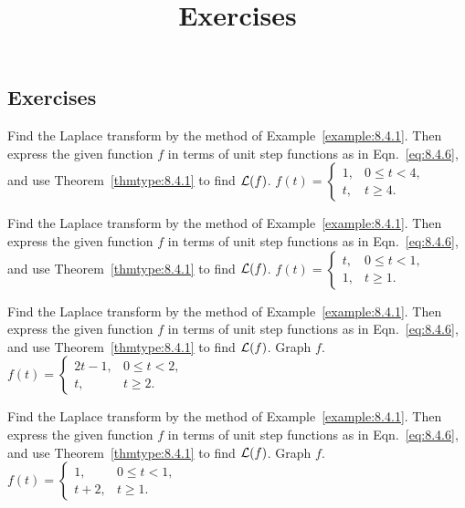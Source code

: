 \documentclass{ximera}
\title{Exercises} \license{CC BY-NC-SA 4.0}
\begin{document}
\begin{abstract}
\end{abstract}
\maketitle

\begin{onlineOnly}
\section*{Exercises}
\end{onlineOnly}

\begin{problem}\label{exer:8.4.1} 
Find the Laplace transform by
the method of Example~\ref{example:8.4.1}. Then express the given function
$f$ in terms of unit step functions as in Eqn.~\eqref{eq:8.4.6}, and use
Theorem~\ref{thmtype:8.4.1} to find ${\cal L}(f)$.
$f(t)=\left\{\begin{array}{cl} 1,&0
\le t<4,\\ t,&t\ge4.\end{array}\right.$
\end{problem}

\begin{problem}\label{exer:8.4.2} 
Find the Laplace transform by
the method of Example~\ref{example:8.4.1}. Then express the given function
$f$ in terms of unit step functions as in Eqn.~\eqref{eq:8.4.6}, and use
Theorem~\ref{thmtype:8.4.1} to find ${\cal L}(f)$.
$f(t)=\left\{\begin{array}{cl} t,&0
\le t<1,\\ 1,&t\ge1.\end{array}\right.$
\end{problem}

\begin{problem}\label{exer:8.4.3} 
Find the Laplace transform by
the method of Example~\ref{example:8.4.1}. Then express the given function
$f$ in terms of unit step functions as in Eqn.~\eqref{eq:8.4.6}, and use
Theorem~\ref{thmtype:8.4.1} to find ${\cal L}(f)$.  Graph $f$.
$f(t)=\left\{\begin{array}{cl} 2t-1,&
0\le t<2,\\  t,&t\ge2.\end{array}\right.$
\end{problem}

\begin{problem}\label{exer:8.4.4}
Find the Laplace transform by
the method of Example~\ref{example:8.4.1}. Then express the given function
$f$ in terms of unit step functions as in Eqn.~\eqref{eq:8.4.6}, and use
Theorem~\ref{thmtype:8.4.1} to find ${\cal L}(f)$.  Graph $f$.
$f(t)=\left\{\begin{array}{cl}1,
&0\le t<1,\\ t+2,&t\ge1.\end{array}\right.$
\end{problem}
\end{document}
